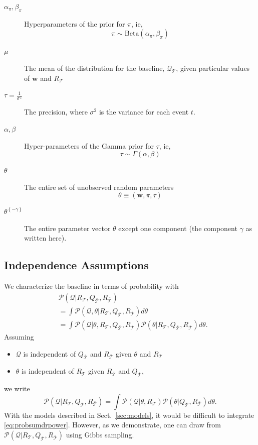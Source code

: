 \documentclass[journal]{IEEEtran}
\newcommand{\prob}{\mathcal{P}}
\newcommand{\eventset}{\mathcal{T}}
\newcommand{\wvector}{\mathbf w}
\newcommand{\context}{{\bar {\mathcal{T}}}}
\newcommand{\drpower}{Q}
\newcommand{\sumdrpower}{{\mathcal{Q}}}
\newcommand{\referencepower}{R}
\newcommand{\outdr}{\drpower_\context}
\newcommand{\inreference}{\referencepower_\eventset}
\newcommand{\outreference}{\referencepower_\context}
\newcommand{\thetasans}[1]{\theta^{\left\{-#1\right\}}}
\begin{document}
\begin{description}
\item [$\alpha_\pi, \beta_\pi$] Hyperparameters of the prior for
  $\pi$, ie,
  \begin{equation*}
    \pi \sim \text{Beta}(\alpha_\pi, \beta_\pi )
  \end{equation*}
\item[$\mu$] The mean of the distribution for the baseline,
  $\sumdrpower_\eventset$, given particular values of $\wvector$ and
  $\inreference$
\item[$\tau = \frac{1}{\sigma^2}$] The precision, where $\sigma^2$ is
  the variance for each event $t$.
\item[$\alpha, \beta$] Hyper-parameters of the Gamma prior for $\tau$,
  ie,
  \begin{equation*}
    \tau \sim \Gamma(\alpha, \beta)
  \end{equation*}
\item[$\theta$] The entire set of unobserved random parameters
  \begin{equation*}
    \theta \equiv \left(\wvector, \pi, \tau \right)
  \end{equation*}
\item[$\thetasans{\gamma}$] The entire parameter vector $\theta$
  except one component (the component $\gamma$ as written here).
\end{description}

\subsection{Independence Assumptions}
\label{sec:Independence}

We characterize the baseline in terms of probability with
\begin{align*}
  &\prob(\sumdrpower|\inreference, \outdr, \outreference) \\
  &= \int \prob \left( \sumdrpower, \theta |\inreference, \outdr,
    \outreference \right) d\theta \\
  &= \int \prob \left( \sumdrpower | \theta, \inreference, \outdr,
    \outreference \right) \prob \left( \theta| \inreference, \outdr,
    \outreference \right) d\theta.
\end{align*}
Assuming
\begin{itemize}
\item $\sumdrpower$ is independent of $\outdr$ and $\outreference$ given
  $\theta$ and $\inreference$
\item $\theta$ is independent of $\inreference$ given $\outreference$
  and $\outdr$,
\end{itemize}
we write
\begin{equation}
  \label{eq:probsumdrpower}
  \prob(\sumdrpower|\inreference, \outdr, \outreference) = \int \prob \left(
    \sumdrpower | \theta, \inreference \right) \prob \left( \theta| \outdr,
    \outreference \right) d\theta.
\end{equation}
With the models described in Sect.~\ref{sec:models}, it would be
difficult to integrate \eqref{eq:probsumdrpower}.  However, as we
demonstrate, one can draw from
$\prob(\sumdrpower|\inreference, \outdr, \outreference)$ using Gibbs
sampling.
\end{document}
